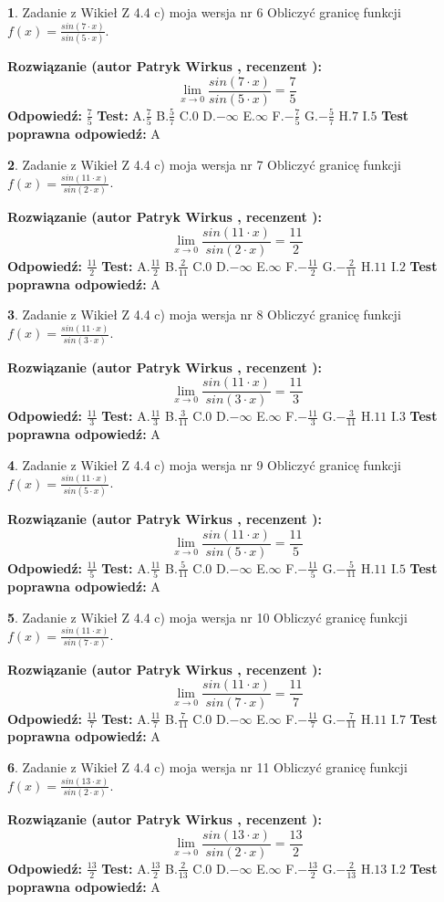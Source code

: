 \documentclass[12pt, a4paper]{article}
\theoremstyle{definition} %
\newtheorem{zad}{}
\newcommand{\zadStart}[1]{\begin{zad}#1\newline}
\newcommand{\zadStop}{\end{zad}}
\newcommand{\rozwStart}[2]{\noindent \textbf{Rozwiązanie (autor #1 , recenzent #2): }\newline}
\newcommand{\rozwStop}{\newline}
\newcommand{\odpStart}{\noindent \textbf{Odpowiedź:}\newline}
\newcommand{\odpStop}{\newline}
\newcommand{\testStart}{\noindent \textbf{Test:}\newline}
\newcommand{\testStop}{\newline}
\newcommand{\kluczStart}{\noindent \textbf{Test poprawna odpowiedź:}\newline}
\newcommand{\kluczStop}{\newline}
\begin{document}
\zadStart{Zadanie z Wikieł Z 4.4 c) moja wersja nr 6}
Obliczyć granicę funkcji $f(x)=\frac{sin(7\cdot x)}{sin(5\cdot x)}$.
\zadStop
\rozwStart{Patryk Wirkus}{}
$$\lim\limits_{x\to 0}\frac{sin(7\cdot x)}{sin(5\cdot x)}=
\frac{7}{5}$$
\rozwStop
\odpStart
$\frac{7}{5}$
\odpStop
\testStart
A.$\frac{7}{5}$
B.$\frac{5}{7}$
C.$0$
D.$-\infty$
E.$\infty$
F.$-\frac{7}{5}$
G.$-\frac{5}{7}$
H.$7$
I.$5$
\testStop
\kluczStart
A
\kluczStop



\zadStart{Zadanie z Wikieł Z 4.4 c) moja wersja nr 7}
Obliczyć granicę funkcji $f(x)=\frac{sin(11\cdot x)}{sin(2\cdot x)}$.
\zadStop
\rozwStart{Patryk Wirkus}{}
$$\lim\limits_{x\to 0}\frac{sin(11\cdot x)}{sin(2\cdot x)}=
\frac{11}{2}$$
\rozwStop
\odpStart
$\frac{11}{2}$
\odpStop
\testStart
A.$\frac{11}{2}$
B.$\frac{2}{11}$
C.$0$
D.$-\infty$
E.$\infty$
F.$-\frac{11}{2}$
G.$-\frac{2}{11}$
H.$11$
I.$2$
\testStop
\kluczStart
A
\kluczStop



\zadStart{Zadanie z Wikieł Z 4.4 c) moja wersja nr 8}
Obliczyć granicę funkcji $f(x)=\frac{sin(11\cdot x)}{sin(3\cdot x)}$.
\zadStop
\rozwStart{Patryk Wirkus}{}
$$\lim\limits_{x\to 0}\frac{sin(11\cdot x)}{sin(3\cdot x)}=
\frac{11}{3}$$
\rozwStop
\odpStart
$\frac{11}{3}$
\odpStop
\testStart
A.$\frac{11}{3}$
B.$\frac{3}{11}$
C.$0$
D.$-\infty$
E.$\infty$
F.$-\frac{11}{3}$
G.$-\frac{3}{11}$
H.$11$
I.$3$
\testStop
\kluczStart
A
\kluczStop



\zadStart{Zadanie z Wikieł Z 4.4 c) moja wersja nr 9}
Obliczyć granicę funkcji $f(x)=\frac{sin(11\cdot x)}{sin(5\cdot x)}$.
\zadStop
\rozwStart{Patryk Wirkus}{}
$$\lim\limits_{x\to 0}\frac{sin(11\cdot x)}{sin(5\cdot x)}=
\frac{11}{5}$$
\rozwStop
\odpStart
$\frac{11}{5}$
\odpStop
\testStart
A.$\frac{11}{5}$
B.$\frac{5}{11}$
C.$0$
D.$-\infty$
E.$\infty$
F.$-\frac{11}{5}$
G.$-\frac{5}{11}$
H.$11$
I.$5$
\testStop
\kluczStart
A
\kluczStop



\zadStart{Zadanie z Wikieł Z 4.4 c) moja wersja nr 10}
Obliczyć granicę funkcji $f(x)=\frac{sin(11\cdot x)}{sin(7\cdot x)}$.
\zadStop
\rozwStart{Patryk Wirkus}{}
$$\lim\limits_{x\to 0}\frac{sin(11\cdot x)}{sin(7\cdot x)}=
\frac{11}{7}$$
\rozwStop
\odpStart
$\frac{11}{7}$
\odpStop
\testStart
A.$\frac{11}{7}$
B.$\frac{7}{11}$
C.$0$
D.$-\infty$
E.$\infty$
F.$-\frac{11}{7}$
G.$-\frac{7}{11}$
H.$11$
I.$7$
\testStop
\kluczStart
A
\kluczStop



\zadStart{Zadanie z Wikieł Z 4.4 c) moja wersja nr 11}
Obliczyć granicę funkcji $f(x)=\frac{sin(13\cdot x)}{sin(2\cdot x)}$.
\zadStop
\rozwStart{Patryk Wirkus}{}
$$\lim\limits_{x\to 0}\frac{sin(13\cdot x)}{sin(2\cdot x)}=
\frac{13}{2}$$
\rozwStop
\odpStart
$\frac{13}{2}$
\odpStop
\testStart
A.$\frac{13}{2}$
B.$\frac{2}{13}$
C.$0$
D.$-\infty$
E.$\infty$
F.$-\frac{13}{2}$
G.$-\frac{2}{13}$
H.$13$
I.$2$
\testStop
\kluczStart
A
\kluczStop
\end{document}
